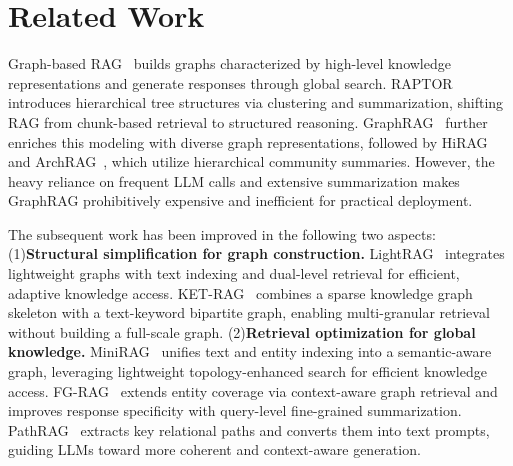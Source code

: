 \documentclass[11pt]{article}
\begin{document}




\section{Related Work}
Graph-based RAG~\cite{peng2024graph} builds graphs characterized by high-level knowledge representations and generate responses through global search. RAPTOR~\cite{sarthi2024raptor} introduces hierarchical tree structures via clustering and summarization, shifting RAG from chunk-based retrieval to structured reasoning. GraphRAG~\cite{edge2024local} further enriches this modeling with diverse graph representations, followed by HiRAG~\cite{huang2025retrieval} and ArchRAG~\cite{wang2025archrag}, which utilize hierarchical community summaries. However, the heavy reliance on frequent LLM calls and extensive summarization makes GraphRAG prohibitively expensive and inefficient for practical deployment.

The subsequent work has been improved in the following two aspects: (1)\textbf{Structural simplification for graph construction.} LightRAG~\cite{guo2024lightrag} integrates lightweight graphs with text indexing and dual-level retrieval for efficient, adaptive knowledge access. KET-RAG~\cite{huang2025ket} combines a sparse knowledge graph skeleton with a text-keyword bipartite graph, enabling multi-granular retrieval without building a full-scale graph. (2)\textbf{Retrieval optimization for global knowledge.} MiniRAG~\cite{fan2025minirag} unifies text and entity indexing into a semantic-aware graph, leveraging lightweight topology-enhanced search for efficient knowledge access. FG-RAG~\cite{hong2025fg} extends entity coverage via context-aware graph retrieval and improves response specificity with query-level fine-grained summarization. PathRAG~\cite{chen2025pathrag} extracts key relational paths and converts them into text prompts, guiding LLMs toward more coherent and context-aware generation.
\end{document}
